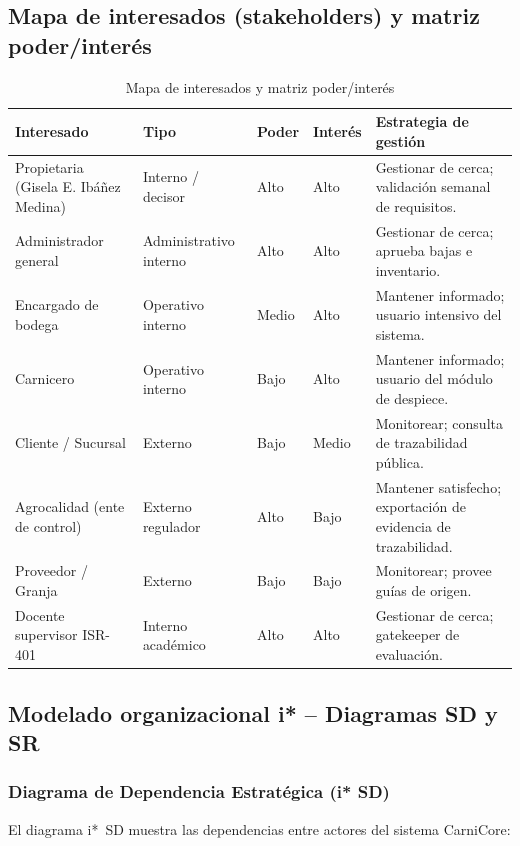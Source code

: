 \documentclass[11pt,a4paper]{article}
\begin{document}
\subsection{Mapa de interesados (stakeholders) y matriz poder/interés}

\begin{longtable}{|p{3.2cm}|p{2.5cm}|p{2cm}|p{2cm}|p{5cm}|}
\caption{Mapa de interesados y matriz poder/interés}\\
\hline
\textbf{Interesado} & \textbf{Tipo} & \textbf{Poder} & \textbf{Interés} & \textbf{Estrategia de gestión} \\
\hline
Propietaria (Gisela E. Ibáñez Medina) & Interno / decisor & Alto & Alto & Gestionar de cerca; validación semanal de requisitos. \\
\hline
Administrador general & Administrativo interno & Alto & Alto & Gestionar de cerca; aprueba bajas e inventario. \\
\hline
Encargado de bodega & Operativo interno & Medio & Alto & Mantener informado; usuario intensivo del sistema. \\
\hline
Carnicero & Operativo interno & Bajo & Alto & Mantener informado; usuario del módulo de despiece. \\
\hline
Cliente / Sucursal & Externo & Bajo & Medio & Monitorear; consulta de trazabilidad pública. \\
\hline
Agrocalidad (ente de control) & Externo regulador & Alto & Bajo & Mantener satisfecho; exportación de evidencia de trazabilidad. \\
\hline
Proveedor / Granja & Externo & Bajo & Bajo & Monitorear; provee guías de origen. \\
\hline
Docente supervisor ISR-401 & Interno académico & Alto & Alto & Gestionar de cerca; gatekeeper de evaluación. \\
\hline
\end{longtable}

\subsection{Modelado organizacional i* -- Diagramas SD y SR}

\subsubsection{Diagrama de Dependencia Estratégica (i* SD)}

El diagrama i*~SD muestra las dependencias entre actores del sistema CarniCore:
\end{document}
